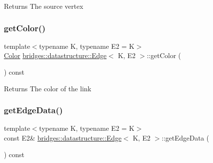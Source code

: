 \begin{DoxyReturn}{Returns}
The source vertex 
\end{DoxyReturn}
\mbox{\label{classbridges_1_1datastructure_1_1_edge_abb5c66b734e1ac71e5d4e012908ec7a4}} 
\subsubsection{\texorpdfstring{get\+Color()}{getColor()}}
{\footnotesize\ttfamily template$<$typename K, typename E2 = K$>$ \\
\hyperlink{classbridges_1_1datastructure_1_1_color}{Color} \hyperlink{classbridges_1_1datastructure_1_1_edge}{bridges\+::datastructure\+::\+Edge}$<$ K, E2 $>$\+::get\+Color (\begin{DoxyParamCaption}{ }\end{DoxyParamCaption}) const\hspace{0.3cm}{\ttfamily [inline]}}

\begin{DoxyReturn}{Returns}
The color of the link 
\end{DoxyReturn}
\mbox{\label{classbridges_1_1datastructure_1_1_edge_a4769b5d8fc74522f77f5927b230ced7b}} 
\subsubsection{\texorpdfstring{get\+Edge\+Data()}{getEdgeData()}\hspace{0.1cm}{\footnotesize\ttfamily [1/2]}}
{\footnotesize\ttfamily template$<$typename K, typename E2 = K$>$ \\
const E2\& \hyperlink{classbridges_1_1datastructure_1_1_edge}{bridges\+::datastructure\+::\+Edge}$<$ K, E2 $>$\+::get\+Edge\+Data (\begin{DoxyParamCaption}{ }\end{DoxyParamCaption}) const\hspace{0.3cm}{\ttfamily [inline]}}

